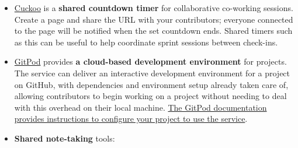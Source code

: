 \documentclass[
]{book}
\providecommand{\tightlist}{%
  \setlength{\itemsep}{0pt}\setlength{\parskip}{0pt}}
\begin{document}
\begin{itemize}
\tightlist
\item
  \href{https://cuckoo.team/}{Cuckoo}
  is a \textbf{shared countdown timer} for collaborative co-working sessions.
  Create a page and share the URL with your contributors;
  everyone connected to the page will be notified when the set countdown ends.
  Shared timers such as this can be useful to help coordinate sprint
  sessions between check-ins.
\item
  \href{https://www.gitpod.io/}{GitPod}
  provides \textbf{a cloud-based development environment} for projects.
  The service can deliver an interactive development environment for a project
  on GitHub, with dependencies and environment setup already taken care of,
  allowing contributors to begin working on a project without needing to
  deal with this overhead on their local machine.
  \href{https://www.gitpod.io/docs/configuration/}{The GitPod documentation provides instructions to configure your project to use the service}.
\item
  \textbf{Shared note-taking} tools:


\end{itemize}
\end{document}
